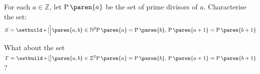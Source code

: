 For each $a \in \mathbb{Z}$,
let $\operatorname{P}\paren{a}$ be the set of prime divisors of $a$.
Characterise the set:
\begin{equation*}
  S = \setbuild*[\Big]{\paren{a, b} \in \mathbb{N}^{2}}{
        \operatorname{P}\paren{a} = \operatorname{P}\paren{b}, \,
        \operatorname{P}\paren{a + 1} = \operatorname{P}\paren{b + 1}}
\end{equation*}

What about the set
$\displaystyle{
 T = \setbuild*[\big]{\paren{a, b} \in \mathbb{Z}^{2}}{
       \operatorname{P}\paren{a} = \operatorname{P}\paren{b}, \,
       \operatorname{P}\paren{a + 1} = \operatorname{P}\paren{b + 1}}
}$
?
